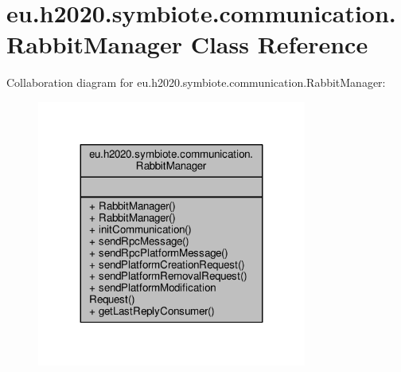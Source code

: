 \hypertarget{classeu_1_1h2020_1_1symbiote_1_1communication_1_1RabbitManager}{}\section{eu.\+h2020.\+symbiote.\+communication.\+Rabbit\+Manager Class Reference}
\label{classeu_1_1h2020_1_1symbiote_1_1communication_1_1RabbitManager}


Collaboration diagram for eu.\+h2020.\+symbiote.\+communication.\+Rabbit\+Manager\+:
\nopagebreak
\begin{figure}[H]
\begin{center}
\leavevmode
\includegraphics[width=251pt]{classeu_1_1h2020_1_1symbiote_1_1communication_1_1RabbitManager__coll__graph}
\end{center}
\end{figure}
